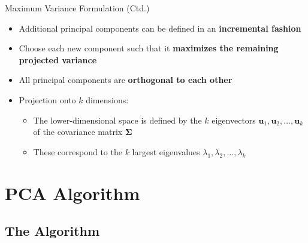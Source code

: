 \begin{frame}{Maximum Variance Formulation (Ctd.)}{}
	\begin{itemize}
		\item Additional principal components can be defined in an \textbf{incremental fashion}
		\item Choose each new component such that it \textbf{maximizes the remaining projected variance} 
		\item All principal components are \textbf{orthogonal to each other}
		\item Projection onto $k$ dimensions:
		\begin{itemize}
			\item The lower-dimensional space is defined by the $k$ eigenvectors $\bm{u}_1, \bm{u}_2, \dots, \bm{u}_k$ of the
				covariance matrix $\bm{\Sigma}$
			\item These correspond to the $k$ largest eigenvalues $\lambda_1, \lambda_2, \dots, \lambda_k$
		\end{itemize}
	\end{itemize}
\end{frame}


\section{PCA Algorithm}

\subsection{The Algorithm}

